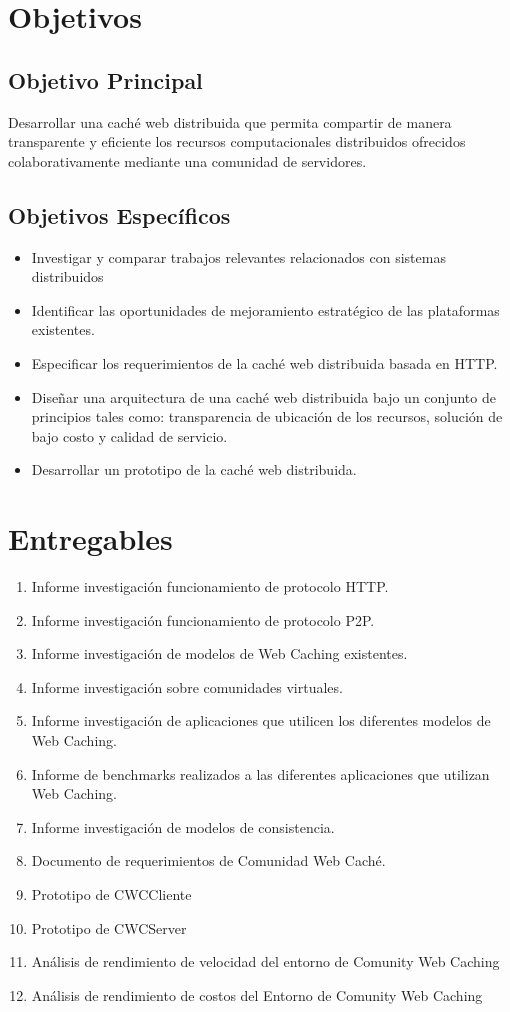 \section{Objetivos}
\subsection{Objetivo Principal}
Desarrollar una caché web distribuida que permita compartir de manera transparente y eficiente los recursos computacionales distribuidos ofrecidos colaborativamente mediante una comunidad de servidores.

\subsection{Objetivos Específicos}
\begin{itemize}
\item Investigar y comparar trabajos relevantes relacionados con sistemas distribuidos
\item Identificar las oportunidades de mejoramiento estratégico de las plataformas existentes.
\item Especificar los requerimientos de la caché web distribuida basada en HTTP.
\item Diseñar una arquitectura de una caché web distribuida bajo un conjunto de principios tales como: transparencia de ubicación de los recursos, solución de bajo costo y calidad de servicio.
\item Desarrollar un prototipo de la caché web distribuida.
\end{itemize}

\section{Entregables}
\begin{enumerate}
\item Informe investigación funcionamiento de protocolo HTTP.
\item Informe investigación funcionamiento de protocolo P2P.
\item Informe investigación de modelos de Web Caching existentes.
\item Informe investigación sobre comunidades virtuales.
\item Informe investigación de aplicaciones que utilicen los diferentes modelos de Web Caching.
\item Informe de benchmarks realizados a las diferentes aplicaciones que utilizan Web Caching.
\item Informe investigación de modelos de consistencia.
\item Documento de requerimientos de Comunidad Web Caché.
\item Prototipo de CWCCliente
\item Prototipo de CWCServer 
\item Análisis de rendimiento de velocidad del entorno de Comunity Web Caching
\item Análisis de rendimiento de costos del Entorno de Comunity Web Caching
\end{enumerate}  


